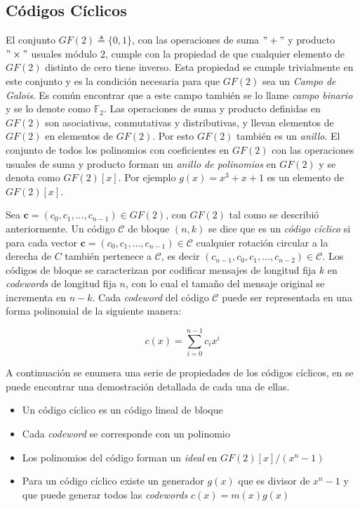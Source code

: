 \subsection{Códigos Cíclicos}
El conjunto $GF(2) \triangleq \{0,1\}$, con las operaciones de suma $" + "$ y producto $" \times "$ usuales módulo 2, cumple con la propiedad de que cualquier elemento de $GF(2)$ distinto de cero tiene inverso. Esta propiedad se cumple trivialmente en este conjunto y es la condición necesaria para que $GF(2)$ sea un \textit{Campo de Galois}. Es común encontrar que a este campo también se lo llame \textit{campo binario} y se lo denote como $\mathbb {F}_2$.
Las operaciones de suma y producto definidas en $GF(2)$ son asociativas, conmutativas y distributivas, y llevan elementos de $GF(2)$ en elementos de $GF(2)$. Por esto $GF(2)$ también es un \textit{anillo}. 
El conjunto de todos los polinomios con coeficientes en $GF(2)$ con las operaciones usuales de suma y producto forman un \textit{anillo de polinomios} en $GF(2)$ y se denota como $GF(2)[x]$. Por ejemplo $g(x) = x^3 + x + 1$ es un elemento de $GF(2)[x]$.

Sea $\textbf{c} = (c_0, c_1, ..., c_{n-1}) \in GF(2)$, con $GF(2)$ tal como se describió anteriormente. Un código $\mathcal{C}$ de bloque $(n, k)$ se dice que es un \textit{código cíclico} si para cada vector $\textbf{c} = (c_0, c_1, ..., c_{n-1}) \in \mathcal{C}$ cualquier rotación circular a la derecha de $C$ también pertenece a $\mathcal{C}$, es decir $(c_{n-1}, c_0, c_1, ..., c_{n-2}) \in \mathcal{C}$.
Los códigos de bloque se caracterizan por codificar mensajes de longitud fija $k$ en \textit{codewords} de longitud fija $n$, con lo cual el tamaño del mensaje original se incrementa en $n-k$.
Cada \textit{codeword} del código $\mathcal{C}$ puede ser representada en una forma polinomial de la siguiente manera:

\begin{equation}
c(x) = \sum_{i = 0}^{n-1}c_i x^i
\end{equation}

A continuación se enumera una serie de propiedades de los códigos cíclicos, en \cite{moon2005error} se puede encontrar una demostración detallada de cada una de ellas.

\begin{itemize}
\item{Un código cíclico es un código lineal de bloque}
\item{Cada \textit{codeword} se corresponde con un polinomio}
\item{Los polinomios del código forman un \textit{ideal} en $GF(2)[x]/(x^n-1)$}
\item{Para un código cíclico existe un generador $g(x)$ que es divisor de $x^n-1$ y que puede generar todos las \textit{codewords} $c(x)=m(x)g(x)$}
\end{itemize}

